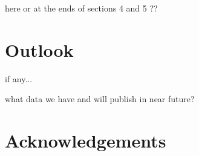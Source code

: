 \documentclass[TOTEM]{cern/cernphprep}
\def\un#1{\,{\rm #1}}
\def\acknowledgments{\section*{Acknowledgements}}
\def\hang{\hangindent=\parindent}
\def\>{\par\vskip\itskip\parindent\itindent\indent\hang\llap{\hbox to3mm{$\bullet$\hss}}}
\def\>E{\par\vskip\itskip\parindent\itindent\indent\hang\llap{\hbox to3mm{\hss}}}
\def\>>{\par\vskip\iitskip\parindent\iitindent\indent\hang\llap{\hbox to\iitindent{\hss--\ }}}
\begin{document}
\> here or at the ends of sections 4 and 5 ??


\section{Outlook}

\> if any...

\> what data we have and will publish in near future?


\acknowledgments

\iffalse
We are indebted to the beam optics development team
for the design, the thorough preparations and the successful commissioning of the $\beta^* = 90\un{m}$ optics. We congratulate the CERN accelerator groups for the very smooth operation in 2011. We thank
the LHC machine coordinators for scheduling the dedicated fills.

We are grateful to CMS for providing their luminosity measurements.

This work was supported by the institutions listed on the front page and partially also by NSF (US), the Magnus
Ehrnrooth foundation (Finland), the Waldemar von Frenckell foundation (Finland), the Academy of
Finland, the OTKA grant NK 101438, 73143 (Hungary) and the NKTH-OTKA grant 74458 (Hungary).

\fi
\end{document}
